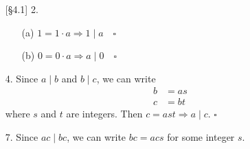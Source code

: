 \documentclass{article}
\begin{document}
\begin{enumerate}
    \item[{[\S 4.1]} 2.]
        \begin{itemize}
            \item[(a)] $1 = 1 \cdot a \Rightarrow 1 \mid a \quad\square$
            \item[(b)] $0 = 0 \cdot a \Rightarrow a \mid 0 \quad\square$
        \end{itemize}
    \item[4.] Since $a \mid b$ and $b \mid c$, we can write
        \begin{align*}
        b &= as \\
        c &= bt
        \end{align*}
        where $s$ and $t$ are integers. Then $c = ast \Rightarrow a \mid c$. $\square$
    \item[7.] Since $ac \mid bc$, we can write $bc = acs$ for some integer $s$.


\end{enumerate}
\end{document}
